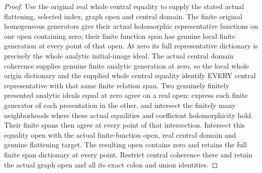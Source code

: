 \begin{proof}
Use the original real whole central equality to supply the stated actual
flattening, selected index, graph open and central domain. The finite original
homogeneous generators give their actual holomorphic representative functions
on one open containing zero; their finite function span has genuine local
finite generation at every point of that open. At zero its full representative
dictionary is precisely the whole analytic initial-image ideal. The actual
central domain coherence supplies genuine finite analytic generation at zero,
so the local whole origin dictionary and the supplied whole central equality
identify EVERY central representative with that same finite relation span.
Two genuinely finitely presented analytic ideals equal at zero agree on a
real open: express each finite generator of each presentation in the other,
and intersect the finitely many neighborhoods where these actual equalities
and coefficient holomorphicity hold. Their finite spans then agree at every
point of that intersection. Intersect this equality open with the actual
finite-function open, real central domain and genuine flattening target.
The resulting open contains zero and retains the full finite span dictionary
at every point. Restrict central coherence there and retain the actual graph
open and all its exact colon and union identities.
\end{proof}

